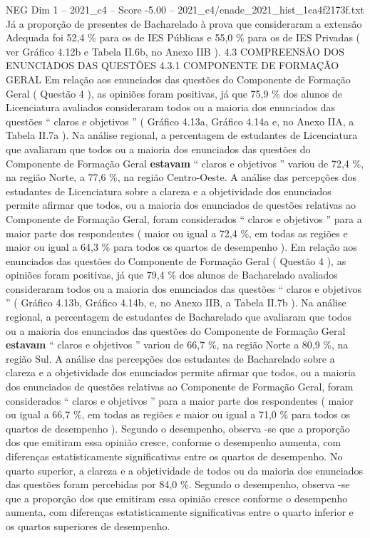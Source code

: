 \begin{textsample}{NEG Dim 1 – 2021\_c4 – Score -5.00 – 2021\_c4/enade\_2021\_hist\_1ca4f2173f.txt}
Já a proporção de presentes de Bacharelado à prova que consideraram a extensão Adequada foi 52,4 \% para os de IES Públicas e 55,0 \% para os de IES Privadas ( ver Gráfico 4.12b e Tabela II.6b, no Anexo IIB ). 4.3 COMPREENSÃO DOS ENUNCIADOS DAS QUESTÕES 4.3.1 COMPONENTE DE FORMAÇÃO GERAL Em relação aos enunciados das questões do Componente de Formação Geral ( Questão 4 ), as opiniões foram positivas, já que 75,9 \% dos alunos de Licenciatura avaliados consideraram todos ou a maioria dos enunciados das questões “ claros e objetivos ” ( Gráfico 4.13a, Gráfico 4.14a e, no Anexo IIA, a Tabela II.7a ).
Na análise regional, a percentagem de estudantes de Licenciatura que avaliaram que todos ou a maioria dos enunciados das questões do Componente de Formação Geral \textbf{estavam} “ claros e objetivos ” variou de 72,4 \%, na região Norte, a 77,6 \%, na região Centro-Oeste.
A análise das percepções dos estudantes de Licenciatura sobre a clareza e a objetividade dos enunciados permite afirmar que todos, ou a maioria dos enunciados de questões relativas ao Componente de Formação Geral, foram considerados “ claros e objetivos ” para a maior parte dos respondentes ( maior ou igual a 72,4 \%, em todas as regiões e maior ou igual a 64,3 \% para todos os quartos de desempenho ).
Em relação aos enunciados das questões do Componente de Formação Geral ( Questão 4 ), as opiniões foram positivas, já que 79,4 \% dos alunos de Bacharelado avaliados consideraram todos ou a maioria dos enunciados das questões “ claros e objetivos ” ( Gráfico 4.13b, Gráfico 4.14b, e, no Anexo IIB, a Tabela II.7b ).
Na análise regional, a percentagem de estudantes de Bacharelado que avaliaram que todos ou a maioria dos enunciados das questões do Componente de Formação Geral \textbf{estavam} “ claros e objetivos ” variou de 66,7 \%, na região Norte a 80,9 \%, na região Sul.
A análise das percepções dos estudantes de Bacharelado sobre a clareza e a objetividade dos enunciados permite afirmar que todos, ou a maioria dos enunciados de questões relativas ao Componente de Formação Geral, foram considerados “ claros e objetivos ” para a maior parte dos respondentes ( maior ou igual a 66,7 \%, em todas as regiões e maior ou igual a 71,0 \% para todos os quartos de desempenho ).
Segundo o desempenho, observa -se que a proporção dos que emitiram essa opinião cresce, conforme o desempenho aumenta, com diferenças estatisticamente significativas entre os quartos de desempenho.
No quarto superior, a clareza e a objetividade de todos ou da maioria dos enunciados das questões foram percebidas por 84,0 \%.
Segundo o desempenho, observa -se que a proporção dos que emitiram essa opinião cresce conforme o desempenho aumenta, com diferenças estatisticamente significativas entre o quarto inferior e os quartos superiores de desempenho.

\end{textsample}
